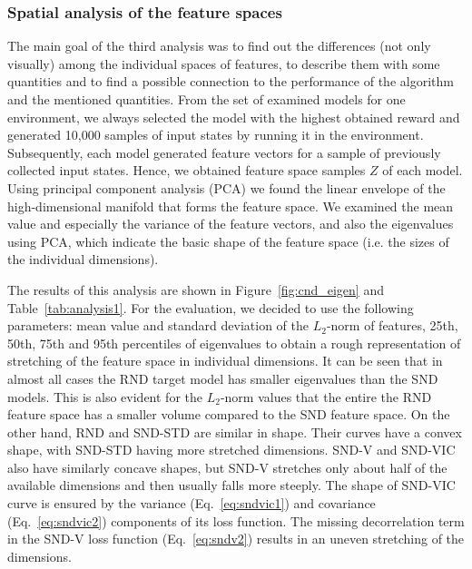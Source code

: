 \documentclass[a4paper,11pt]{elsarticle}
\begin{document}
\subsubsection{Spatial analysis of the feature spaces}

The main goal of the third analysis was to find out the differences (not only visually) among the individual spaces of features, to describe them with some quantities and to find a possible connection to the performance of the algorithm and the mentioned quantities. From the set of examined models for one environment, we always selected the model with the highest obtained reward and generated 10,000 samples of input states by running it in the environment. Subsequently, each model generated feature vectors for a sample of previously collected input states. Hence, we obtained feature space samples $Z$ of each model. Using principal component analysis (PCA) we found the linear envelope of the high-dimensional manifold that forms the feature space. We examined the mean value and especially the variance of the feature vectors, and also the eigenvalues using PCA, which indicate the basic shape of the feature space (i.e. the sizes of the individual dimensions).

The results of this analysis are shown in Figure~\ref{fig:cnd_eigen} and Table~\ref{tab:analysis1}. For the evaluation, we decided to use the following parameters: mean value and standard deviation of the $L_{2}$-norm of features, 25th, 50th, 75th and 95th percentiles of eigenvalues to obtain a rough representation of stretching of the feature space in individual dimensions.
It can be seen that in almost all cases the RND target model has smaller eigenvalues than the SND models. This is also evident for the $L_2$-norm values that the entire the RND feature space has a smaller volume compared to the SND feature space. 
On the other hand, RND and SND-STD are similar in shape. Their curves have a convex shape, with SND-STD having more stretched dimensions. SND-V and SND-VIC also have similarly concave shapes, but SND-V stretches only about half of the available dimensions and then usually falls more steeply. 
The shape of SND-VIC curve is ensured by the variance (Eq.~\ref{eq:sndvic1}) and covariance (Eq.~\ref{eq:sndvic2}) components of its loss function. The missing decorrelation term in the SND-V loss function (Eq.~\ref{eq:sndv2}) results in an uneven stretching of the dimensions.
\end{document}
